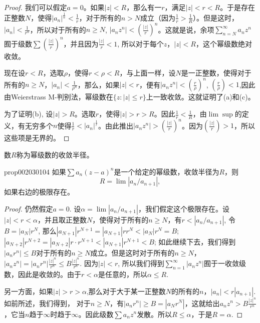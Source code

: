 \begin{proof}
我们可以假定$a = 0$。如果$|z|<R$，那么有一$r$，满足$|z| < r < R$。于是存在正整数$N$，使得$|a_n|^{\frac{1}{n}} < \frac{1}{r}$，对于所有的$n > N$成立（因为$\frac{1}{r} > \frac{1}{R}$）。但是这时，$|a_n| < \frac{1}{r^n}$，所以对于所有的$n \ge N$, $|a_nz^n| < (\frac{|z|}{r})^n$。这就是说，余项$\sum\limits_{n=N}^{\infty}{a_nz^n}$囿于级数$\sum{(\frac{|z|}{r})^n}$，并且因为$\frac{|z|}{r} < 1$, 所以对于每个$z$，$|z|<R$，这个幂级数绝对收敛。

现在设$r < R$，选取$\rho$，使得$r < \rho < R$，与上面一样，设$N$是一正整数，使得对于所有的$n \ge N$，$|a_n| < \frac{1}{\rho^n}$，那么，如果$|z|<r$，便有$|a_nz^n| < (\frac{r}{\rho})^n$, $(\frac{r}{\rho})<1$,因此由Weierstrass M-判别法，幂级数在$\{z: |z| \le r\}$上一致收敛。这就证明了(a)和(c)。

为了证明(b), 设$|z|>R$。选取$r$，使得$|z| > r > R$。因此$\frac{1}{r} < \frac{1}{R}$，由$\lim\sup$的定义，有无穷多个$n$使得$\frac{1}{r} < |a_n|^{\frac{1}{r}}$。由此推出$|a_nz^n|>(\frac{|z|}{r})^n$。因为$(\frac{|z|}{r}) > 1$，所以这些项是无界的。
\end{proof}

数$R$称为幂级数的收敛半径。

\begin{proposition}{}{prop002030104}
如果$\sum{a_n(z-a)^n}$是一个给定的幂级数，收敛半径为$R$，则
\[
R = \lim{|a_n/a_{n+1}|},
\]
如果右边的极限存在。
\end{proposition}

\begin{proof}
仍然假定$a = 0$. 设$\alpha = \lim{|a_n /a_{n+1}|}$，我们假定这个极限存在。设$|z|<r < \alpha$，并且取正整数$N$，使得对于所有的$n \ge N$，有$r < |a_n / a_{n+1}|$, 令$B = |a_N|r^N$, 那么$|a_{N+1}|r^{N+1} = |a_{N+1}|rr^N < |a_N|r^N = B$; $|a_{N+2}|r^{N+2} = |a_{N+2}|r \cdot r^{N+1} < |a_{N+1}|r^{N+1} < B$; 如此继续下去，我们得到$|a_nr^n| \le B$对于所有的$n \ge N$成立。但是这时对于所有的$n \ge N$，$|a_nz^n| = |a_nr^n|\frac{|z|^n}{r^n} \le B\frac{|z|^n}{r^n}$. 因为$|z|<r$, 所以我们得到$\sum\limits_{n=1}^{\infty}{|a_nz^n|}$囿于一收敛级数，因此是收敛的。由于$r < \alpha$是任意的，所以$\alpha \le R$.

另一方面，如果$|z| > r > \alpha$,那么对于大于某一正整数$N$的所有的$n$，$|a_n|< r|a_{n+1}|$. 如前所述，我们得到， 对于$n \ge N$，有$|a_nr^n| \ge B = |a_Nr^N|$，这就给出$a_nz^n > B\frac{|z|^n}{r^n}$，它当$n$趋于$\infty$时趋于$\infty$。因此级数$\sum{a_nz^n}$发散。所以$R \le \alpha$，于是$R = \alpha$.
\end{proof}

